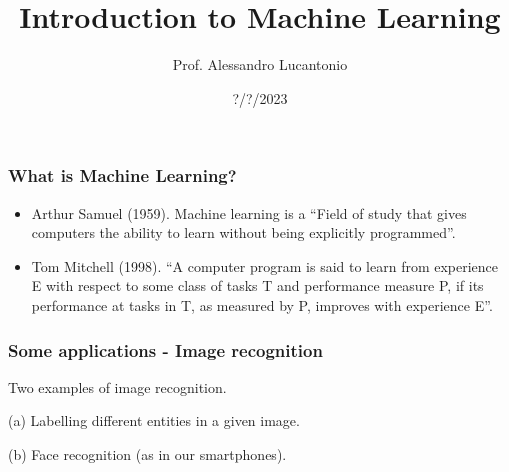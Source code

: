 \documentclass{beamer}
\title{Introduction to Machine Learning}
\author{Prof. Alessandro Lucantonio}
\institute{Aarhus University - Department of Mechanical and Production Engineering}
\date{?/?/2023}
\begin{document}
	
	\frame{\titlepage}
	
	\begin{frame}
		\frametitle{What is Machine Learning?}
		\begin{itemize}
			\item Arthur Samuel (1959). Machine learning is a “Field of study that gives computers the ability to learn without being explicitly programmed”.
			\item Tom Mitchell (1998). “A computer program is said to learn from experience E with respect to some class of tasks T and performance measure P, if its performance at tasks in T, as measured by P, improves with experience E”.
		\end{itemize}
		
	\end{frame}

	\begin{frame}		
		\frametitle{Some applications - Image recognition}
		\begin{figure}
			\centering
			\qquad
		\end{figure}
	Two examples of image recognition. 
	
	(a) Labelling different entities in a given image. 
	
	(b) Face recognition (as in our smartphones).
	\end{frame}
\end{document}
